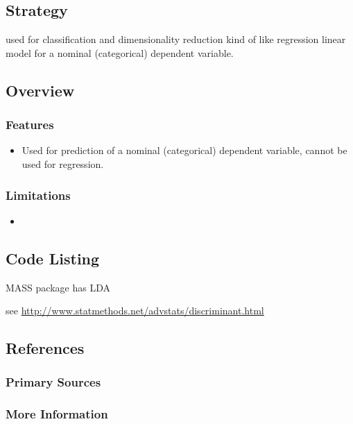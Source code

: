 \subsection{Strategy}

used for classification and dimensionality reduction
kind of like regression
linear model for a nominal (categorical) dependent variable.


\subsection{Overview}

\subsubsection{Features}

\begin{itemize}
	\item Used for prediction of a nominal (categorical) dependent variable, cannot be used for regression.
\end{itemize}

\subsubsection{Limitations}

\begin{itemize}
	\item 
\end{itemize}


\subsection{Code Listing}

MASS package has LDA

see \url{http://www.statmethods.net/advstats/discriminant.html}

\subsection{References}

\subsubsection{Primary Sources}



\subsubsection{More Information}





